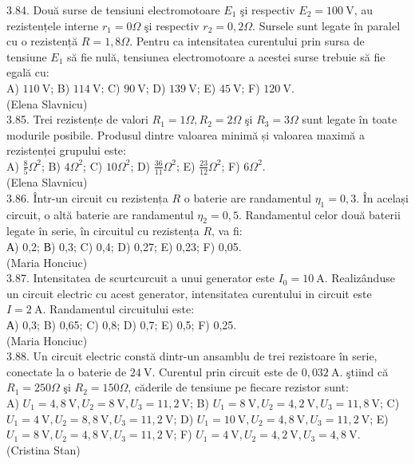 \documentclass[10pt]{article}
\begin{document}
3.84. Două surse de tensiuni electromotoare $E_{1}$ şi respectiv $E_{2}=100 \mathrm{~V}$, au rezistențele interne $r_{1}=0 \Omega$ şi respectiv $r_{2}=0,2 \Omega$. Sursele sunt legate în paralel cu o rezistență $R=1,8 \Omega$. Pentru ca intensitatea curentului prin sursa de tensiune $E_{1}$ să fie nulă, tensiunea electromotoare a acestei surse trebuie să fie egală cu:\\ A) $110 \mathrm{~V}$; B) $114 \mathrm{~V}$; C) $90 \mathrm{~V}$; D) $139 \mathrm{~V}$; E) $45 \mathrm{~V}$; F) $120 \mathrm{~V}$.\\ (Elena Slavnicu)\\

3.85. Trei rezistențe de valori $R_{1}=1 \Omega, R_{2}=2 \Omega$ şi $R_{3}=3 \Omega$ sunt legate în toate modurile posibile. Produsul dintre valoarea minimă și valoarea maximă a rezistenței grupului este:\\ A) $\frac{8}{5} \Omega^{2}$; B) $4 \Omega^{2}$; C) $10 \Omega^{2}$; D) $\frac{36}{11} \Omega^{2}$; E) $\frac{23}{12} \Omega^{2}$; F) $6 \Omega^{2}$.\\ (Elena Slavnicu)\\

3.86. Într-un circuit cu rezistența $R$ o baterie are randamentul $\eta_{1}=0,3$. În același circuit, o altă baterie are randamentul $\eta_{2}=0,5$. Randamentul celor două baterii legate în serie, în circuitul cu rezistența $R$, va fi:\\ А) 0,2; В) 0,3; C) 0,4; D) 0,27; E) 0,23; F) 0,05.\\ (Maria Honciuc)\\

3.87. Intensitatea de scurtcurcuit a unui generator este $I_{0}=10 \mathrm{~A}$. Realizânduse un circuit electric cu acest generator, intensitatea curentului in circuit este $I=2 \mathrm{~A}$. Randamentul circuitului este:\\ А) 0,3; B) 0,65; C) 0,8; D) 0,7; E) 0,5; F) 0,25.\\ (Maria Honciuc)\\

3.88. Un circuit electric constă dintr-un ansamblu de trei rezistoare în serie, conectate la o baterie de $24 \mathrm{~V}$. Curentul prin circuit este de $0,032 \mathrm{~A}$. ştiind că $R_{1}=250 \Omega$ şi $R_{2}=150 \Omega$, căderile de tensiune pe fiecare rezistor sunt:\\ A) $U_{1}=4,8 \mathrm{~V} , U_{2}=8 \mathrm{~V} , U_{3}=11,2 \mathrm{~V}$; B) $U_{1}=8 \mathrm{~V} , U_{2}=4,2 \mathrm{~V} , U_{3}=11,8 \mathrm{~V}$; C) $U_{1}=4 \mathrm{~V} , U_{2}=8,8 \mathrm{~V} , U_{3}=11,2 \mathrm{~V}$; D) $U_{1}=10 \mathrm{~V} , U_{2}=4,8 \mathrm{~V} , U_{3}=11,2 \mathrm{~V}$; E) $U_{1}=8 \mathrm{~V} , U_{2}=4,8 \mathrm{~V} , U_{3}=11,2 \mathrm{~V}$; F) $U_{1}=4 \mathrm{~V} , U_{2}=4,2 \mathrm{~V} , U_{3}=4,8 \mathrm{~V}$.\\ (Cristina Stan)\\
\end{document}
